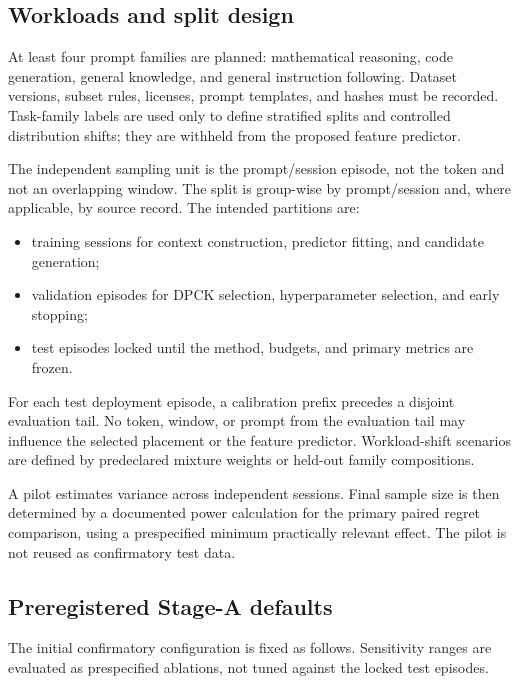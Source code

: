 \documentclass[a4paper,preprint,review,12pt,authoryear]{elsarticle}
\begin{document}
\subsection{Workloads and split design}

At least four prompt families are planned: mathematical reasoning, code generation, general knowledge, and general instruction following. Dataset versions, subset rules, licenses, prompt templates, and hashes must be recorded. Task-family labels are used only to define stratified splits and controlled distribution shifts; they are withheld from the proposed feature predictor.

The independent sampling unit is the prompt/session episode, not the token and not an overlapping window. The split is group-wise by prompt/session and, where applicable, by source record. The intended partitions are:
\begin{itemize}[leftmargin=*]
  \item training sessions for context construction, predictor fitting, and candidate generation;
  \item validation episodes for DPCK selection, hyperparameter selection, and early stopping;
  \item test episodes locked until the method, budgets, and primary metrics are frozen.
\end{itemize}
For each test deployment episode, a calibration prefix precedes a disjoint evaluation tail. No token, window, or prompt from the evaluation tail may influence the selected placement or the feature predictor. Workload-shift scenarios are defined by predeclared mixture weights or held-out family compositions.

A pilot estimates variance across independent sessions. Final sample size is then determined by a documented power calculation for the primary paired regret comparison, using a prespecified minimum practically relevant effect. The pilot is not reused as confirmatory test data.

\subsection{Preregistered Stage-A defaults}

The initial confirmatory configuration is fixed as follows. Sensitivity ranges are evaluated as prespecified ablations, not tuned against the locked test episodes.
\end{document}
